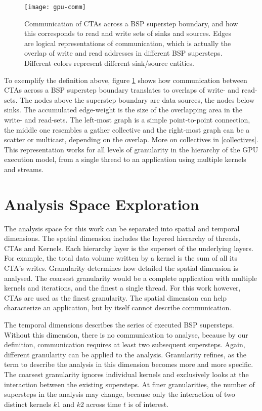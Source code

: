 \begin{figure}[t]
	\centering
	\texttt{[image: gpu-comm]}
	\caption[CTA Communication]{Communication of CTAs across a BSP superstep boundary, and how this corresponds to read and write sets 
	of sinks and sources. Edges are logical representations of communication, which is actually the overlap of write and read addresses in different BSP supersteps. Different colors represent different sink/source entities.}
	\label{gpu-comm}
\end{figure} 
To exemplify the definition above, figure \ref{gpu-comm} shows how communication between CTAs across a 
BSP superstep boundary translates to overlaps of write- and read-sets. The nodes above the superstep boundary are data sources, the nodes below sinks. The accumulated edge-weight is the size of the 
overlapping area in the write- and read-sets. The left-most graph is a simple point-to-point connection, the middle one resembles a gather collective and the right-most graph can be a scatter or multicast, depending on the overlap. More on collectives in \ref{collectives}.
This representation works for all levels of granularity in the hierarchy of the GPU execution model, from a single thread to an application using multiple kernels and streams.

\section{Analysis Space Exploration}

The analysis space for this work can be separated into spatial and temporal dimensions. The spatial dimension includes the layered hierarchy of threads, CTAs and Kernels. Each hierarchy layer is the superset of the underlying layers. For example, the total data volume written by a kernel is the sum of all its CTA's writes. 
Granularity determines how detailed the spatial dimension is analysed.
The coarsest granularity would be a complete application with multiple kernels and iterations, and the finest a single thread. For this work however, CTAs are used as the finest granularity. The spatial dimension can help characterize an application, but by itself cannot describe communication.

The temporal dimensions describes the series of executed BSP supersteps. Without this dimension, there is no communication to analyse, because by our definition, communication requires at least two subsequent supersteps.
Again, different granularity can be applied to the analysis. Granularity refines, as the term to describe the analysis in this dimension becomes more and more specific. The coarsest granularity ignores individual kernels and exclusively looks at the interaction between the existing supersteps. At finer granularities, the number of supersteps in the analysis may change, because only the interaction of two distinct kernels $k1$ and $k2$ across time $t$ is of interest.

